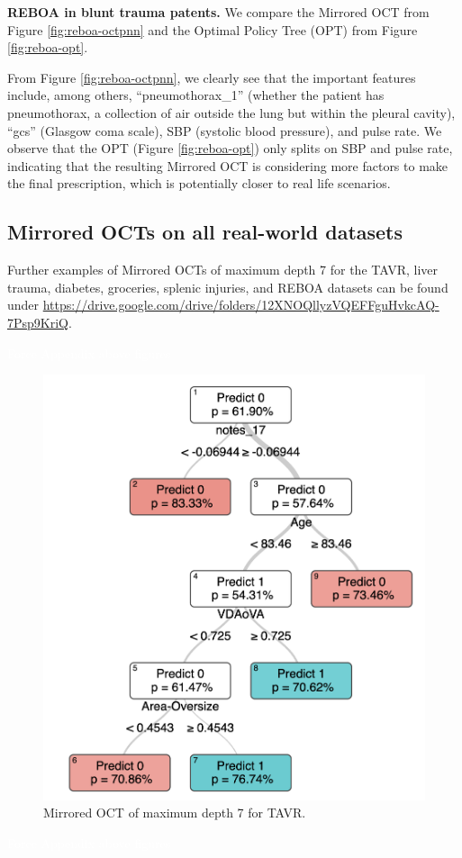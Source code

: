 \documentclass[10pt]{article} %
\begin{document}
\textbf{REBOA in blunt trauma patents.} We compare the Mirrored OCT from Figure \ref{fig:reboa-octpnn} and the Optimal Policy Tree (OPT) from Figure \ref{fig:reboa-opt}. 

From Figure \ref{fig:reboa-octpnn}, we clearly see that the important features include, among others, ``pneumothorax\_1'' (whether the patient has pneumothorax, a collection of air outside the lung but within the pleural cavity), ``gcs'' (Glasgow coma scale), SBP (systolic blood pressure), and pulse rate. We observe that the OPT (Figure \ref{fig:reboa-opt}) only splits on SBP and pulse rate, indicating that the resulting Mirrored OCT is considering more factors to make the final prescription, which is potentially closer to real life scenarios. 

\subsection{Mirrored OCTs on all real-world datasets}\label{appendix-oct-pnn}
Further examples of Mirrored OCTs of maximum depth 7 for the TAVR, liver trauma, diabetes, groceries, splenic injuries, and REBOA datasets can be found under \url{https://drive.google.com/drive/folders/12XNOQllyzVQEFFguHvkcAQ-7Psp9KriQ}. 


\textcolor{white}{Force Appendix above figures}

\begin{figure}
  \begin{center}
    \caption{Mirrored OCT of maximum depth 7 for TAVR.}\label{fig:tavr-octpnn} \includegraphics[height=0.45\textwidth] {images/TAVR_OCT_seed1_iter1.png}
    \end{center}
\end{figure}

\textcolor{white}{Force Appendix above figures}
\end{document}
